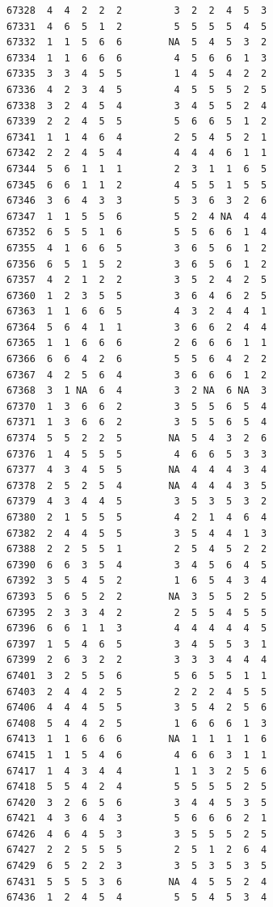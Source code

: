 \documentclass[
  letterpaper,
  DIV=11,
  numbers=noendperiod]{scrreprt}
\begin{document}
\begin{verbatim}
67328  4  4  2  2  2         3  2  2  4  5  3
67331  4  6  5  1  2         5  5  5  5  4  5
67332  1  1  5  6  6        NA  5  4  5  3  2
67334  1  1  6  6  6         4  5  6  6  1  3
67335  3  3  4  5  5         1  4  5  4  2  2
67336  4  2  3  4  5         4  5  5  5  2  5
67338  3  2  4  5  4         3  4  5  5  2  4
67339  2  2  4  5  5         5  6  6  5  1  2
67341  1  1  4  6  4         2  5  4  5  2  1
67342  2  2  4  5  4         4  4  4  6  1  1
67344  5  6  1  1  1         2  3  1  1  6  5
67345  6  6  1  1  2         4  5  5  1  5  5
67346  3  6  4  3  3         5  3  6  3  2  6
67347  1  1  5  5  6         5  2  4 NA  4  4
67352  6  5  5  1  6         5  5  6  6  1  4
67355  4  1  6  6  5         3  6  5  6  1  2
67356  6  5  1  5  2         3  6  5  6  1  2
67357  4  2  1  2  2         3  5  2  4  2  5
67360  1  2  3  5  5         3  6  4  6  2  5
67363  1  1  6  6  5         4  3  2  4  4  1
67364  5  6  4  1  1         3  6  6  2  4  4
67365  1  1  6  6  6         2  6  6  6  1  1
67366  6  6  4  2  6         5  5  6  4  2  2
67367  4  2  5  6  4         3  6  6  6  1  2
67368  3  1 NA  6  4         3  2 NA  6 NA  3
67370  1  3  6  6  2         3  5  5  6  5  4
67371  1  3  6  6  2         3  5  5  6  5  4
67374  5  5  2  2  5        NA  5  4  3  2  6
67376  1  4  5  5  5         4  6  6  5  3  3
67377  4  3  4  5  5        NA  4  4  4  3  4
67378  2  5  2  5  4        NA  4  4  4  3  5
67379  4  3  4  4  5         3  5  3  5  3  2
67380  2  1  5  5  5         4  2  1  4  6  4
67382  2  4  4  5  5         3  5  4  4  1  3
67388  2  2  5  5  1         2  5  4  5  2  2
67390  6  6  3  5  4         3  4  5  6  4  5
67392  3  5  4  5  2         1  6  5  4  3  4
67393  5  6  5  2  2        NA  3  5  5  2  5
67395  2  3  3  4  2         2  5  5  4  5  5
67396  6  6  1  1  3         4  4  4  4  4  5
67397  1  5  4  6  5         3  4  5  5  3  1
67399  2  6  3  2  2         3  3  3  4  4  4
67401  3  2  5  5  6         5  6  5  5  1  1
67403  2  4  4  2  5         2  2  2  4  5  5
67406  4  4  4  5  5         3  5  4  2  5  6
67408  5  4  4  2  5         1  6  6  6  1  3
67413  1  1  6  6  6        NA  1  1  1  1  6
67415  1  1  5  4  6         4  6  6  3  1  1
67417  1  4  3  4  4         1  1  3  2  5  6
67418  5  5  4  2  4         5  5  5  5  2  5
67420  3  2  6  5  6         3  4  4  5  3  5
67421  4  3  6  4  3         5  6  6  6  2  1
67426  4  6  4  5  3         3  5  5  5  2  5
67427  2  2  5  5  5         2  5  1  2  6  4
67429  6  5  2  2  3         3  5  3  5  3  5
67431  5  5  5  3  6        NA  4  5  5  2  4
67436  1  2  4  5  4         5  5  4  5  3  4

\end{verbatim}
\end{document}

